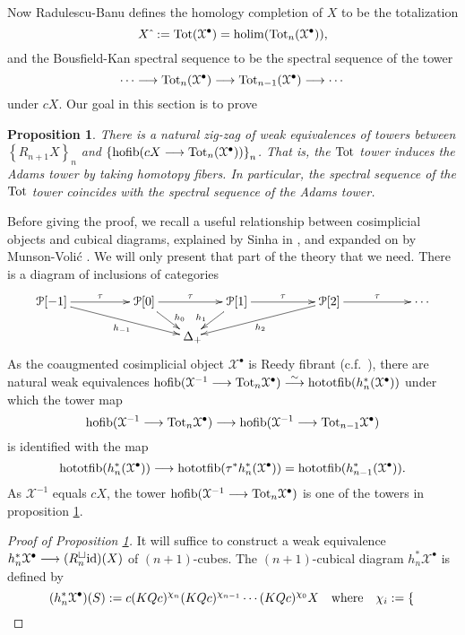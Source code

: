 \documentclass[11pt]{amsart}
\theoremstyle{plain}
\newtheorem{prop}[thm]{Proposition}
\theoremstyle{definition}
\DeclareMathOperator*{\holim}{holim}
\DeclareMathOperator*{\hofib}{hofib}
\renewcommand{\to}{\longrightarrow}
\newcommand{\calP}{\mathcal{P}}
\newcommand{\calX}{\mathcal{X}}
\theoremstyle{plain}
\newcommand{\Id}{\textup{id}}
\newcommand{\plainD}{R}
\begin{document}
\begin{BK spec seq}
Now Radulescu-Banu defines the homology completion of $X$ to be the totalization
\[X\hat{\ }:=\textup{Tot}(\calX^\bullet)=\holim (\textup{Tot}_n(\calX^\bullet)),\]
and the Bousfield-Kan spectral sequence to be the spectral sequence of the tower
\[\cdots \to\textup{Tot}_n(\calX^\bullet)\to \textup{Tot}_{n-1}(\calX^\bullet)\to\cdots \]
under $cX$. Our goal in this section is to prove
\begin{prop}\label{towerIdentification}
There is a natural zig-zag of weak equivalences of towers between $\left\{\plainD_{n+1}X\right\}_n$ and $\left\{\hofib(cX\to\textup{Tot}_{n}(\calX^\bullet))\right\}_n$. That is,  the $\textup{Tot}$ tower induces the Adams tower by taking homotopy fibers. In particular, the spectral sequence of the $\textup{Tot}$ tower coincides with the spectral sequence of the Adams tower.
\end{prop}
Before giving the proof, we recall a useful relationship between cosimplicial objects and cubical diagrams, explained by Sinha in \cite[Theorem 6.5]{SinhaSpacesOfKnots.pdf}, and expanded on by Munson-Voli\'c \cite{CubicalHomotopyTheory.pdf}.
We will only present that part of the theory that we need. There is a diagram of inclusions of categories
\[\xymatrix@!0@R=10mm@C=13mm{
\calP[-1]\ar[rr]^-{\tau}\ar_-{h_{-1}}[drrr]
&&%
\calP[0]\ar[rr]^-{\tau}\ar^(.65){\!h_{0}}[dr]
&&%
\calP[1]\ar[rr]^-{\tau}\ar_(.65){h_{1}\!}[dl]
&&%
\calP[2]\ar[rr]^-{\tau}\ar^-{h_{2}}[dlll]
&&%
\cdots \\
&&&\Delta_+\!\!
}\]
As the coaugmented cosimplicial object $\calX^\bullet$ is Reedy fibrant (c.f.\ \cite[{X.4.9}]{YellowMonster}), there are natural weak equivalences $\hofib(\calX^{-1}\to\textup{Tot}_n\calX^\bullet) \overset{\smash{\sim}}{\to} \textup{hototfib}(h_n^*(\calX^\bullet))$ under which the tower map 
\[\hofib(\calX^{-1}\to\textup{Tot}_n\calX^\bullet)\to \hofib(\calX^{-1}\to\textup{Tot}_{n-1}\calX^\bullet)\]
is identified with the map
\[\textup{hototfib}(h_n^*(\calX^\bullet))\to \textup{hototfib}(\tau^*h_n^*(\calX^\bullet))=\textup{hototfib}(h_{n-1}^*(\calX^\bullet)).\]
As $\calX^{-1}$ equals $cX$, the tower $\hofib(\calX^{-1}\to\textup{Tot}_n\calX^{\bullet})$ is one of the towers in proposition \ref{towerIdentification}.
\begin{proof}[Proof of Proposition \ref{towerIdentification}] 
It will suffice to construct a weak equivalence $h_n^*\calX^\bullet\to (\plainD_n^{\smash{\square}}\Id  )(X)$ of $(n+1)$-cubes. The $(n+1)$-cubical diagram $h_n^*\calX^\bullet$ is defined by
\[(h_n^*\calX^\bullet)(S):= c(KQc)^{\chi_{n}}(KQc)^{\chi_{n-1}}\cdots (KQc)^{\chi_0}X\quad \textup{where}\quad \chi_i:=\begin{cases}

\end{cases}\]
\end{proof}
\end{BK spec seq}
\end{document}

